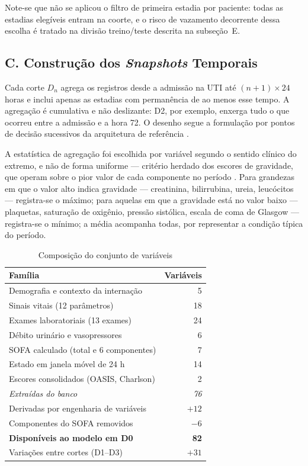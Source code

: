 \documentclass{ieeeaccess}
\begin{document}
Note-se que não se aplicou o filtro de primeira estadia por paciente: todas as estadias elegíveis entram na coorte, e o risco de vazamento decorrente dessa escolha é tratado na divisão treino/teste descrita na subseção~E.

\subsection*{C. Construção dos \textit{Snapshots} Temporais}
Cada corte $D_n$ agrega os registros desde a admissão na UTI até $(n+1)\times 24$ horas e inclui apenas as estadias com permanência de ao menos esse tempo. A agregação é cumulativa e não deslizante: D2, por exemplo, enxerga tudo o que ocorreu entre a admissão e a hora 72. O desenho segue a formulação por pontos de decisão sucessivos da arquitetura de referência \cite{King2022}.

A estatística de agregação foi escolhida por variável segundo o sentido clínico do extremo, e não de forma uniforme --- critério herdado dos escores de gravidade, que operam sobre o pior valor de cada componente no período \cite{Vincent1996}. Para grandezas em que o valor alto indica gravidade --- creatinina, bilirrubina, ureia, leucócitos --- registra-se o máximo; para aquelas em que a gravidade está no valor baixo --- plaquetas, saturação de oxigênio, pressão sistólica, escala de coma de Glasgow --- registra-se o mínimo; a média acompanha todas, por representar a condição típica do período.

\begin{table}[!t]
\caption{Composição do conjunto de variáveis}
\label{tab:features}
\centering
\small
\begin{tabular}{lr}
\hline
\textbf{Família} & \textbf{Variáveis} \\
\hline
Demografia e contexto da internação & 5 \\
Sinais vitais (12 parâmetros) & 18 \\
Exames laboratoriais (13 exames) & 24 \\
Débito urinário e vasopressores & 6 \\
SOFA calculado (total e 6 componentes) & 7 \\
Estado em janela móvel de 24 h & 14 \\
Escores consolidados (OASIS, Charlson) & 2 \\
\hline
\textit{Extraídas do banco} & \textit{76} \\
Derivadas por engenharia de variáveis & $+12$ \\
Componentes do SOFA removidos & $-6$ \\
\hline
\textbf{Disponíveis ao modelo em D0} & \textbf{82} \\
Variações entre cortes (D1--D3) & $+31$ \\
\hline
\end{tabular}
\end{table}
\end{document}

